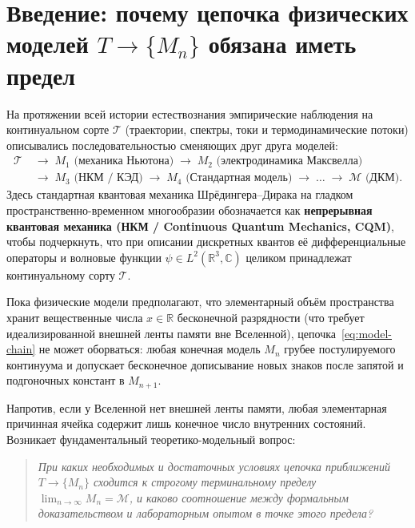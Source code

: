 \documentclass[11pt,a4paper]{article}
\theoremstyle{definition}
\theoremstyle{remark}
\begin{document}
\section{Введение: почему цепочка физических моделей $T \to \{M_n\}$ обязана иметь предел}
\label{sec:intro}

На протяжении всей истории естествознания эмпирические наблюдения на континуальном сорте $\mathcal{T}$ (траектории, спектры, токи и термодинамические потоки) описывались последовательностью сменяющих друг друга моделей:
\begin{equation}
  \label{eq:model-chain}
  \begin{aligned}
    \mathcal{T} &\;\longrightarrow\; M_1 \text{ (механика Ньютона)} \;\longrightarrow\; M_2 \text{ (электродинамика Максвелла)} \\
    &\;\longrightarrow\; M_3 \text{ (НКМ / КЭД)} \;\longrightarrow\; M_4 \text{ (Стандартная модель)} \;\longrightarrow\; \dots \;\longrightarrow\; \mathcal{M} \text{ (ДКМ)}.
  \end{aligned}
\end{equation}
Здесь стандартная квантовая механика Шрёдингера--Дирака на гладком пространственно-временном многообразии обозначается как \textbf{непрерывная квантовая механика (НКМ / Continuous Quantum Mechanics, CQM)}, чтобы подчеркнуть, что при описании дискретных квантов её дифференциальные операторы и волновые функции $\psi\in L^2(\mathbb{R}^3,\mathbb{C})$ целиком принадлежат континуальному сорту $\mathcal{T}$.

Пока физические модели предполагают, что элементарный объём пространства хранит вещественные числа $x\in\mathbb{R}$ бесконечной разрядности (что требует идеализированной внешней ленты памяти вне Вселенной), цепочка~\eqref{eq:model-chain} не может оборваться: любая конечная модель $M_n$ грубее постулируемого континуума и допускает бесконечное дописывание новых знаков после запятой и подгоночных констант в $M_{n+1}$.

Напротив, если у Вселенной нет внешней ленты памяти, любая элементарная причинная ячейка содержит лишь конечное число внутренних состояний. Возникает фундаментальный теоретико-модельный вопрос:
\begin{quote}
  \emph{При каких необходимых и достаточных условиях цепочка приближений $T \to \{M_n\}$ сходится к строгому терминальному пределу $\lim_{n\to\infty} M_n = \mathcal{M}$, и каково соотношение между формальным доказательством и лабораторным опытом в точке этого предела?}
\end{quote}
\end{document}

